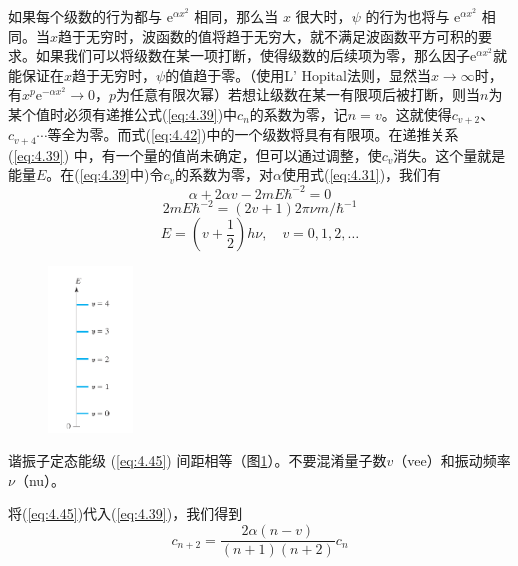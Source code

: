     如果每个级数的行为都与 $\mathrm{e}^{\alpha x^2}$ 相同，那么当 $x$ 很大时，$\psi$ 的行为也将与 $\mathrm{e}^{\alpha x^2}$ 相同。当$x$趋于无穷时，波函数的值将趋于无穷大，就不满足波函数平方可积的要求。如果我们可以将级数在某一项打断，使得级数的后续项为零，那么因子$\mathrm{e}^{\alpha x^2}$就能保证在$x$趋于无穷时，$\psi$的值趋于零。（使用L' Hopital法则，显然当$x \to \infty$时，有$x^p\mathrm{e}^{-\alpha x^2} \to 0$，$p$为任意有限次幂）若想让级数在某一有限项后被打断，则当$n$为某个值时必须有递推公式(\ref{eq:4.39})中$c_n$的系数为零，记$n=v$。这就使得$c_{v+2}$、$c_{v+4}$$\cdots$等全为零。而式(\ref{eq:4.42})中的一个级数将具有有限项。在递推关系 (\ref{eq:4.39}) 中，有一个量的值尚未确定，但可以通过调整，使$c_v$消失。这个量就是能量$E$。在(\ref{eq:4.39}中)令$c_v$的系数为零，对$\alpha$使用式(\ref{eq:4.31})，我们有
    \begin{equation*}
        \alpha + 2\alpha v - 2mE\hbar^{-2} = 0
    \end{equation*}
    \begin{equation*}
        2mE\hbar^{-2} = \left(2v+1\right)2\pi\nu m/\hbar^{-1}
    \end{equation*}
    \begin{equation}
        \boxed{
            E = \left(v+\frac{1}{2}\right)h\nu, \quad v = 0, 1, 2, \ldots
        }
        \label{eq:4.45}
    \end{equation}
    \begin{figure}[h!]
        \centering
        \includegraphics[width=0.2\textwidth]{Figures/4.1.png}
        \caption{}
        \label{fig:4.1}
    \end{figure}
    谐振子定态能级 (\ref{eq:4.45}) 间距相等（图\ref{fig:4.1}）。不要混淆量子数$v$（vee）和振动频率$\nu$（nu）。

     将(\ref{eq:4.45})代入(\ref{eq:4.39})，我们得到
    \begin{equation}
        c_{n+2} = \frac{2\alpha \left(n-v\right)}{(n+1)(n+2)}c_n
        \label{eq:4.46}
    \end{equation}

